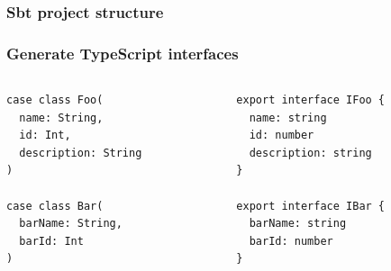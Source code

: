 \documentclass[aspectratio=169]{beamer}
\begin{document}
\begin{frame}[fragile]
\frametitle{Sbt project structure}


\end{frame}

\begin{frame}[fragile]
\frametitle{Generate TypeScript interfaces}

\begin{columns}
\begin{column}{0.4\textwidth}
\begin{lstlisting}[style=myScalaStyle,frame=none]
case class Foo(
  name: String,
  id: Int,
  description: String
)

case class Bar(
  barName: String, 
  barId: Int
)
\end{lstlisting}
\end{column}
\begin{column}{0.4\textwidth}
\begin{lstlisting}[style=myScalaStyle,frame=none]
export interface IFoo {
  name: string
  id: number
  description: string
}

export interface IBar {
  barName: string
  barId: number
}
\end{lstlisting}
\end{column}
\end{columns}
\end{frame}
\end{document}
